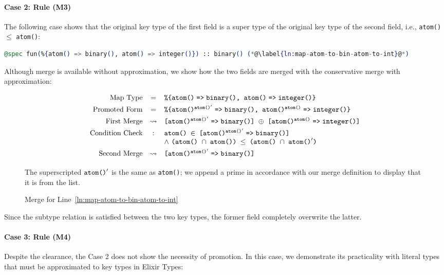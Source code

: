 \paragraph{Case 2: Rule \textsc{(M3)}}
The following case shows that the original key type of the first field is a super type of the original key type of the second field, i.e., \texttt{atom()} $\le$ \texttt{atom()}:

\begin{lstlisting}[language=Elixir, firstnumber=last]
@spec fun(%{atom() => binary(), atom() => integer()}) :: binary() (*@\label{ln:map-atom-to-bin-atom-to-int}@*)
\end{lstlisting}

Although merge is available without approximation, we show how the two fields are merged with the conservative merge with approximation:

\begin{figure}[H]
   \[\begin{array}{rcl}
      \text{Map Type} 
      &=& \texttt{\%\{atom()\fto binary(), atom()\fto integer()\}}
      \\[0.8ex]
      \text{Promoted Form}
      &=& \texttt{\%\{\prokey{atom()}{$\prm{\texttt{atom()}}$}\fto binary(), \prokey{atom()}{atom()}\fto integer()\}}
      \\[0.8ex]
      \text{First Merge}
      &\leadsto& \texttt{[\prokey{atom()}{$\prm{\texttt{atom()}}$}\fto binary()] $\oplus$ [\prokey{atom()}{atom()}\fto integer()]}
      \\[0.8ex]
      \text{Condition Check}
      &:& \texttt{atom() $\in$ [\prokey{atom()}{$\prm{\texttt{atom()}}$}\fto binary()]}
      \\ && \wedge\,\,\texttt{(atom() $\cap$ atom()) $\le$ (atom() $\cap$ $\prm{\texttt{atom()}}$)}
      \\[0.8ex]
      \text{Second Merge}
      &\leadsto& \texttt{[\prokey{atom()}{$\prm{\texttt{atom()}}$}\fto binary()]}
      \nl
   \end{array}\]
   The superscripted \texttt{$\texttt{atom()}^{\prime}$} is the same as \texttt{atom()}; we append a prime in accordance with our merge definition to display that it is from the list.
   \caption{Merge for Line~\ref{ln:map-atom-to-bin-atom-to-int}}
\end{figure}

Since the subtype relation is satisfied between the two key types, the former field completely overwrite the latter.

\paragraph{Case 3: Rule \textsc{(M4)}}
Despite the clearance, the Case 2 does not show the necessity of promotion.
In this case, we demonstrate its practicality with literal types that must be approximated to key types in Elixir Types:

